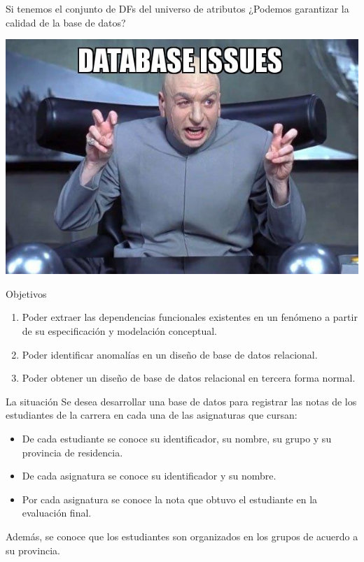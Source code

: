 \begin{frame}{Si tenemos el conjunto de DFs del universo de atributos}
    \centering
    \LARGE ¿Podemos garantizar la calidad de la base de datos?
    
\end{frame}

{
{
    \includegraphics[width=\paperwidth,height=\paperheight]{img/database-issues.jpg}
}
\begin{frame}
\end{frame}
}

\begin{frame}{Objetivos}
    \begin{enumerate}
        \item Poder extraer las dependencias funcionales existentes en un fen\'omeno a partir de su especificaci\'on y modelaci\'on conceptual.
        \item Poder identificar anomal\'ias en un dise\~no de base de datos relacional.
        \item Poder obtener un dise\~no de base de datos relacional en tercera forma normal.
    \end{enumerate}

\end{frame}


\begin{frame}{La situaci\'on}
    Se desea desarrollar una base de datos para registrar las notas
    de los estudiantes de la carrera en cada una de las asignaturas que
    cursan:
    \begin{itemize}
        \item De cada estudiante se conoce su identificador, su nombre, su grupo y su provincia de residencia.
        \item De cada asignatura se conoce su identificador y su nombre.
        \item Por cada asignatura se conoce la nota que obtuvo el estudiante en la evaluaci\'on final.
    \end{itemize}
    Adem\'as, se conoce que los estudiantes son organizados en los grupos de acuerdo a su provincia.
\end{frame}


